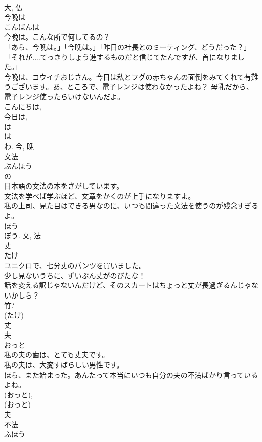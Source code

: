 \documentclass[8pt]{extreport}
\begin{document}
\begin{CJK}{UTF8}{min}
\\	大, 仏	
\\	今晩は	
\\	こんばんは	
\\	今晩は。こんな所で何してるの？	
\\	「あら、今晩は。」「今晩は。」「昨日の社長とのミーティング、どうだった？」「それが....てっきりしょう進するものだと信じてたんですが、首になりました。」	
\\	今晩は、コウイチおじさん。今日は私とフグの赤ちゃんの面倒をみてくれて有難うございます。あ、ところで、電子レンジは使わなかったよね？ 母乳だから、電子レンジ使ったらいけないんだよ。	
\\	こんにちは, 
\\	今日は, 
\\	は 
\\	は 
\\	わ.	今, 晩	
\\	文法	
\\	ぶんぽう	
\\	の 
\\	日本語の文法の本をさがしています。	
\\	文法を学べば学ぶほど、文章をかくのが上手になりますよ。	
\\	私の上司、見た目はできる男なのに、いつも間違った文法を使うのが残念すぎるよ。	
\\	ほう 
\\	ぽう.	文, 法	
\\	丈	
\\	たけ	
\\	ユニクロで、七分丈のパンツを買いました。	
\\	少し見ないうちに、ずいぶん丈がのびたな！	
\\	話を変える訳じゃないんだけど、そのスカートはちょっと丈が長過ぎるんじゃないかしら？	
\\	竹? 
\\	(たけ) 
\\	丈	
\\	夫	
\\	おっと	
\\	私の夫の歯は、とても丈夫です。	
\\	私の夫は、大変すばらしい男性です。	
\\	ほら、また始まった。あんたって本当にいつも自分の夫の不満ばかり言っているよね。	
\\	(おっと), 
\\	(おっと) 
\\	夫	
\\	不法	
\\	ふほう	

\end{CJK}
\end{document}
